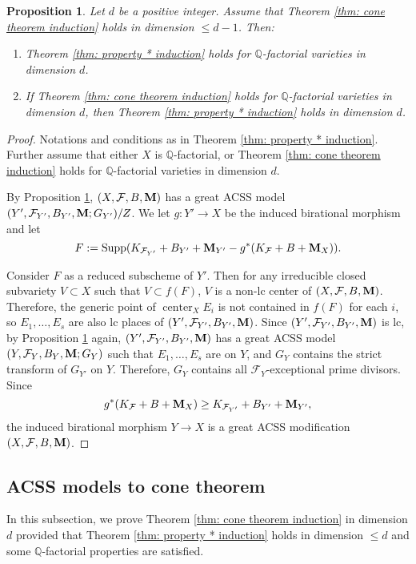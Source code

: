 \documentclass[11pt]{amsart}
\numberwithin{equation}{section}
\newcommand{\Mm}{{\bf{M}}}
\newcommand{\Qq}{\mathbb{Q}}
\newcommand{\Center}{\operatorname{center}}
\newcommand{\Supp}{\operatorname{Supp}}
\newcommand{\Ff}{\mathcal{F}}
\newtheorem{prop}[thm]{Proposition}
\theoremstyle{definition}
\theoremstyle{definition}
\theoremstyle{definition}
\begin{document}
\begin{prop}\label{prop: cone d-1 imply * dim d part 2}
Let $d$ be a positive integer. Assume that Theorem \ref{thm: cone theorem induction} holds in dimension $\leq d-1$. Then:
\begin{enumerate}
    \item Theorem \ref{thm: property * induction} holds for $\Qq$-factorial varieties in dimension $d$.
    \item If Theorem \ref{thm: cone theorem induction} holds for $\Qq$-factorial varieties in dimension $d$, then Theorem \ref{thm: property * induction} holds in dimension $d$.
\end{enumerate}
\end{prop}
\begin{proof}
 Notations and conditions as in Theorem \ref{thm: property * induction}. Further assume that either $X$ is $\Qq$-factorial, or Theorem \ref{thm: cone theorem induction} holds for $\Qq$-factorial varieties in dimension $d$.
 
 By Proposition \ref{prop: cone d-1 imply * dim d part 2}, $(X,\Ff,B,\Mm)$ has a great ACSS model $(Y',\Ff_{Y'},B_{Y'},\Mm;G_{Y'})/Z$. We let $g: Y'\rightarrow X$ be the induced birational morphism and let 
  $$F:=\Supp(K_{\Ff_{Y'}}+B_{Y'}+\Mm_{Y'}-g^*(K_{\Ff}+B+\Mm_X)).$$
  
  Consider $F$ as a reduced subscheme of $Y'$. Then for any irreducible closed subvariety $V\subset X$ such that $V\subset f(F)$, $V$ is a non-lc center of $(X,\Ff,B,\Mm)$. Therefore, the generic point of $\Center_{X}E_i$ is not contained in $f(F)$ for each $i$, so $E_1,\dots,E_s$ are also lc places of  $(Y',\Ff_{Y'},B_{Y'},\Mm)$. Since $(Y',\Ff_{Y'},B_{Y'},\Mm)$ is lc, by Proposition \ref{prop: cone d-1 imply * dim d part 2} again, $(Y',\Ff_{Y'},B_{Y'},\Mm)$ has a great ACSS model $(Y,\Ff_{Y},B_{Y},\Mm;G_Y)$ such that $E_1,\dots,E_s$ are on $Y$, and $G_Y$ contains the strict transform of $G_{Y'}$ on $Y$. Therefore, $G_Y$ contains all $\Ff_Y$-exceptional prime divisors. Since 
 $$g^*(K_{\Ff}+B+\Mm_X)\geq  K_{\Ff_{Y'}}+B_{Y'}+\Mm_{Y'},$$
 the induced birational morphism $Y\rightarrow X$ is a great ACSS modification $(X,\Ff,B,\Mm)$.
\end{proof}


\subsection{ACSS models to cone theorem}

In this subsection, we prove Theorem \ref{thm: cone theorem induction} in dimension $d$ provided that Theorem \ref{thm: property * induction} holds in dimension $\leq d$ and some $\Qq$-factorial properties are satisfied.
\end{document}
